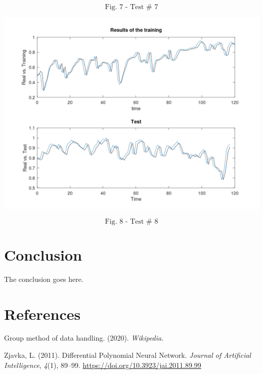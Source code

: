 \documentclass[conference,final,]{IEEEtran}
\makeatletter
\def\maxwidth{\ifdim\Gin@nat@width>\linewidth\linewidth
\else\Gin@nat@width\fi}
\let\Oldincludegraphics\includegraphics
\renewcommand{\includegraphics}[1]{\Oldincludegraphics[width=\maxwidth]{#1}}
\newlength{\cslhangindent}
\newenvironment{cslreferences}%
  {\setlength{\parindent}{0pt}%
  \everypar{\setlength{\hangindent}{\cslhangindent}}\ignorespaces}%
  {\par}
\makeatother
\begin{document}
\[
\text{Fig. 7 - Test # 7}
\]

\includegraphics{../Figures/fig8.png}

\[
\text{Fig. 8 - Test # 8}
\]

\hypertarget{conclusion}{%
\section{Conclusion}\label{conclusion}}

The conclusion goes here.

\newpage

\hypertarget{references}{%
\section*{References}\label{references}}

\hypertarget{refs}{}
\begin{cslreferences}
\leavevmode\hypertarget{ref-GroupMethodData2020}{}%
Group method of data handling. (2020). \emph{Wikipedia}.

\leavevmode\hypertarget{ref-zjavkaDifferentialPolynomialNeural2011}{}%
Zjavka, L. (2011). Differential Polynomial Neural Network. \emph{Journal
of Artificial Intelligence}, \emph{4}(1), 89--99.
\url{https://doi.org/10.3923/jai.2011.89.99}
\end{cslreferences}
\end{document}
